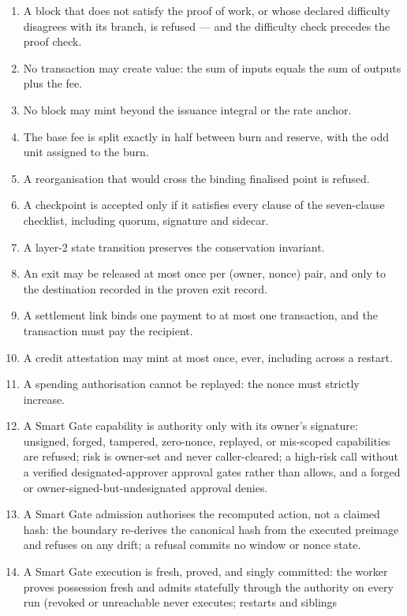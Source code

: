 \documentclass{article}
\begin{document}
\begin{enumerate}
\item A block that does not satisfy the proof of work, or whose declared
  difficulty disagrees with its branch, is refused --- and the difficulty
  check precedes the proof check.
\item No transaction may create value: the sum of inputs equals the sum of
  outputs plus the fee.
\item No block may mint beyond the issuance integral or the rate anchor.
\item The base fee is split exactly in half between burn and reserve, with the
  odd unit assigned to the burn.
\item A reorganisation that would cross the binding finalised point is refused.
\item A checkpoint is accepted only if it satisfies every clause of the
  seven-clause checklist, including quorum, signature and sidecar.
\item A layer-2 state transition preserves the conservation invariant.
\item An exit may be released at most once per (owner, nonce) pair, and only
  to the destination recorded in the proven exit record.
\item A settlement link binds one payment to at most one transaction, and the
  transaction must pay the recipient.
\item A credit attestation may mint at most once, ever, including across a
  restart.
\item A spending authorisation cannot be replayed: the nonce must strictly
  increase.
\item A Smart Gate capability is authority only with its owner's signature:
  unsigned, forged, tampered, zero-nonce, replayed, or mis-scoped capabilities
  are refused; risk is owner-set and never caller-cleared; a high-risk call
  without a verified designated-approver approval gates rather than allows,
  and a forged or owner-signed-but-undesignated approval denies.
\item A Smart Gate admission authorises the recomputed action, not a claimed
  hash: the boundary re-derives the canonical hash from the executed preimage
  and refuses on any drift; a refusal commits no window or nonce state.
\item A Smart Gate execution is fresh, proved, and singly committed: the
  worker proves possession fresh and admits statefully through the authority
  on every run (revoked or unreachable never executes; restarts and siblings

\end{enumerate}
\end{document}
